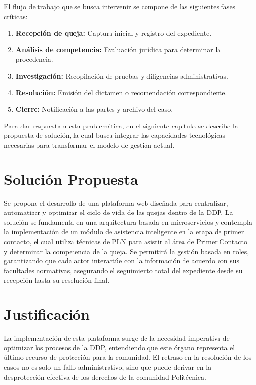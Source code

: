 El flujo de trabajo que se busca intervenir se compone de las siguientes fases críticas:

\begin{enumerate}
\item \textbf{Recepción de queja:} Captura inicial y registro del expediente.
\item \textbf{Análisis de competencia:} Evaluación jurídica para determinar la procedencia.
\item \textbf{Investigación:} Recopilación de pruebas y diligencias administrativas.
\item \textbf{Resolución:} Emisión del dictamen o recomendación correspondiente.
\item \textbf{Cierre:} Notificación a las partes y archivo del caso.
\end{enumerate}

Para dar respuesta a esta problemática, en el siguiente capítulo se describe la propuesta de solución, la cual busca integrar las capacidades tecnológicas necesarias para transformar el modelo de gestión actual.

\section{Solución Propuesta}
Se propone el desarrollo de una plataforma web diseñada para centralizar, automatizar y optimizar el ciclo de vida de las quejas dentro de la DDP. La solución se fundamenta en una arquitectura basada en microservicios y contempla la implementación de un módulo de asistencia inteligente en la etapa de primer contacto, el cual utiliza técnicas de PLN para asistir al área de Primer Contacto y determinar la competencia de la queja. Se permitirá la gestión basada en roles, garantizando que cada actor interactúe con la información de acuerdo con sus facultades normativas, asegurando el seguimiento total del expediente desde su recepción hasta su resolución final.

\section{Justificación}
La implementación de esta plataforma surge de la necesidad imperativa de optimizar los procesos de la DDP, entendiendo que este órgano representa el último recurso de protección para la comunidad. El retraso en la resolución de los casos no es solo un fallo administrativo, sino que puede derivar en la desprotección efectiva de los derechos de la comunidad Politécnica.

